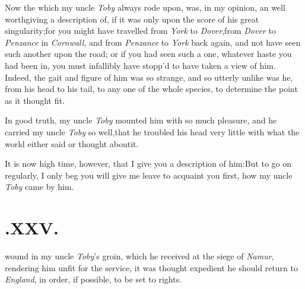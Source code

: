 \documentclass{article}
\begin{document}
Now the  which my\break
uncle \textit{Toby} always rode upon, was, in my\break
opinion, an  well worth\break giving
a description of, if it was only upon the score of his great
singularity;\break for you might have travelled from \textit{York} to
\textit{Dover},\tsk from \textit{Dover} to \textit{Penzance} in
\textit{Cornwall}, and from \textit{Penzance} to \textit{York} back
again, and not have seen such another upon the road; or if you had seen
such a one, whatever haste you had been in, you must infallibly have
stopp’d to have taken a view of him. Indeed, the gait and figure of him
was so strange, and so utterly unlike was he, from his head to his tail,
to any one of the whole species, 
to determine the point as it thought fit.

In good truth, my uncle \textit{Toby} mounted him with so much
pleasure, and he carried my uncle \textit{Toby} so
well,\tsh that he troubled his head very little with what
the world either said or thought about\break it.

It is now high time, however, that I give you a description of
him:\tsk But to go on regularly, I only beg you will give me
leave to acquaint you first, how my uncle \textit{Toby} came by
him.

\null
\section{.\enspace XXV.}

 wound in my uncle \textit{Toby}’s\break
groin, which he received at the\break
siege of \textit{Namur}, rendering him unfit for 
the service, it was thought expedient he
should return to \textit{England}, in order, if\break
possible, to be set to rights.
\end{document}
